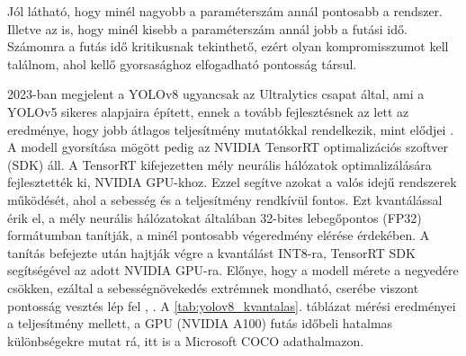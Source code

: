 Jól látható, hogy minél nagyobb a paraméterszám annál pontosabb a
rendszer. Illetve az is, hogy minél kisebb a paraméterszám annál jobb a
futási idő. Számomra a futás idő kritikusnak tekinthető, ezért olyan
kompromisszumot kell találnom, ahol kellő gyorsasághoz elfogadható
pontosság társul.

2023-ban megjelent a YOLOv8 ugyancsak az Ultralytics csapat által, ami a
YOLOv5 sikeres alapjaira épített, ennek a tovább fejlesztésnek az lett
az eredménye, hogy jobb átlagos teljesítmény mutatókkal rendelkezik,
mint elődjei \cite{hussainYOLOv5YOLOv8YOLOv102024}. A modell gyorsítása mögött pedig az NVIDIA
TensorRT optimalizációs szoftver (SDK) áll. A TensorRT kifejezetten mély
neurális hálózatok optimalizálására fejlesztették ki, NVIDIA GPU-khoz.
Ezzel segítve azokat a valós idejű rendszerek működését, ahol a sebesség
és a teljesítmény rendkívül fontos. Ezt kvantálással érik el, a mély
neurális hálózatokat általában 32-bites lebegőpontos (FP32) formátumban
tanítják, a minél pontosabb végeredmény elérése érdekében. A tanítás
befejezte után hajtják végre a kvantálást INT8-ra, TensorRT SDK
segítségével az adott NVIDIA GPU-ra. Előnye, hogy a modell mérete a
negyedére csökken, ezáltal a sebességnövekedés extrémnek mondható,
cserébe viszont pontosság vesztés lép fel \cite{varunImprovingINT8Accuracy2020} , \cite{vinaOptimizingUltralyticsYOLO2025}. A
\ref{tab:yolov8_kvantalas}. táblázat mérési eredményei a teljesítmény
mellett, a GPU (NVIDIA A100) futás időbeli hatalmas különbségekre mutat
rá, itt is a Microsoft COCO adathalmazon.

 \begin{table}[htbp]
	     \centering
	     \caption{YOLOv8 és a kvantálás ereje \cite{hussainYOLOv5YOLOv8YOLOv102024}}
	     \label{tab:yolov8_kvantalas}
	     \vspace{0.2cm}
	 \end{table}

